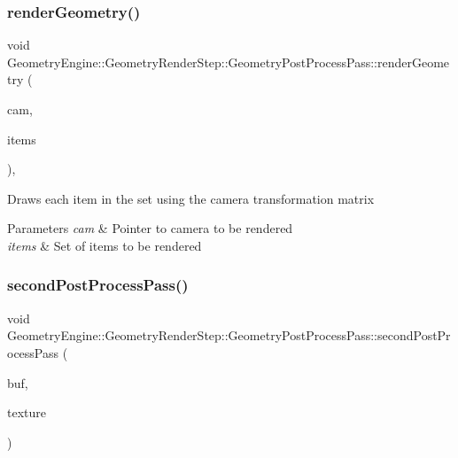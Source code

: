 \subsubsection{\texorpdfstring{renderGeometry()}{renderGeometry()}}
{\footnotesize\ttfamily void Geometry\+Engine\+::\+Geometry\+Render\+Step\+::\+Geometry\+Post\+Process\+Pass\+::render\+Geometry (\begin{DoxyParamCaption}\item[{\mbox{\hyperlink{class_geometry_engine_1_1_geometry_world_item_1_1_geometry_camera_1_1_camera}{Geometry\+World\+Item\+::\+Geometry\+Camera\+::\+Camera}} $\ast$}]{cam,  }\item[{std\+::map$<$ float, \mbox{\hyperlink{class_geometry_engine_1_1_geometry_world_item_1_1_geometry_item_1_1_geometry_item}{Geometry\+World\+Item\+::\+Geometry\+Item\+::\+Geometry\+Item}} $\ast$ $>$ $\ast$}]{items }\end{DoxyParamCaption})\hspace{0.3cm}{\ttfamily [protected]}, {\ttfamily [virtual]}}

Draws each item in the set using the camera transformation matrix 
\begin{DoxyParams}{Parameters}
{\em cam} & Pointer to camera to be rendered \\
\hline
{\em items} & Set of items to be rendered \\
\hline
\end{DoxyParams}
\mbox{\label{class_geometry_engine_1_1_geometry_render_step_1_1_geometry_post_process_pass_ae5bd76667c5fce0189983e4d32b20b83}} 
\subsubsection{\texorpdfstring{secondPostProcessPass()}{secondPostProcessPass()}}
{\footnotesize\ttfamily void Geometry\+Engine\+::\+Geometry\+Render\+Step\+::\+Geometry\+Post\+Process\+Pass\+::second\+Post\+Process\+Pass (\begin{DoxyParamCaption}\item[{\mbox{\hyperlink{class_geometry_engine_1_1_geometry_buffer_1_1_g_buffer}{Geometry\+Buffer\+::\+G\+Buffer}} $\ast$}]{buf,  }\item[{const \mbox{\hyperlink{class_geometry_engine_1_1_geometry_buffer_1_1_g_buffer_a718dceafcac1915f7de061108597e1cc}{Geometry\+Buffer\+::\+G\+Buffer\+::\+G\+B\+U\+F\+F\+E\+R\+\_\+\+T\+E\+X\+T\+U\+R\+E\+\_\+\+T\+Y\+PE}} \&}]{texture }\end{DoxyParamCaption})\hspace{0.3cm}{\ttfamily [protected]}}

